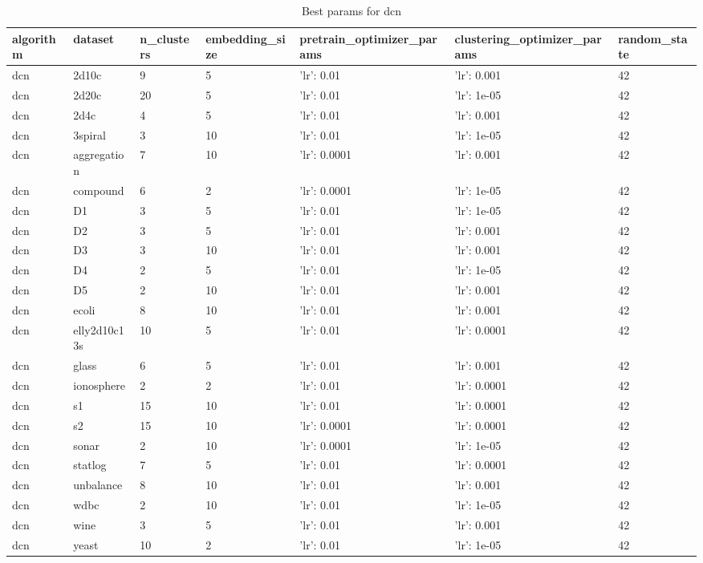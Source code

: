 \begin{table}[H]
\centering
\caption{Best params for dcn}
\label{S13_Table}
\begin{tabular}{|l|l|l|l|l|l|l|}
\hline
algorithm & dataset & n\_clusters & embedding\_size & pretrain\_optimizer\_params & clustering\_optimizer\_params & random\_state \\
\hline
dcn & 2d10c & 9 & 5 & {'lr': 0.01} & {'lr': 0.001} & 42 \\
\hline
dcn & 2d20c & 20 & 5 & {'lr': 0.01} & {'lr': 1e-05} & 42 \\
\hline
dcn & 2d4c & 4 & 5 & {'lr': 0.01} & {'lr': 0.001} & 42 \\
\hline
dcn & 3spiral & 3 & 10 & {'lr': 0.01} & {'lr': 1e-05} & 42 \\
\hline
dcn & aggregation & 7 & 10 & {'lr': 0.0001} & {'lr': 0.001} & 42 \\
\hline
dcn & compound & 6 & 2 & {'lr': 0.0001} & {'lr': 1e-05} & 42 \\
\hline
dcn & D1 & 3 & 5 & {'lr': 0.01} & {'lr': 1e-05} & 42 \\
\hline
dcn & D2 & 3 & 5 & {'lr': 0.01} & {'lr': 0.001} & 42 \\
\hline
dcn & D3 & 3 & 10 & {'lr': 0.01} & {'lr': 0.001} & 42 \\
\hline
dcn & D4 & 2 & 5 & {'lr': 0.01} & {'lr': 1e-05} & 42 \\
\hline
dcn & D5 & 2 & 10 & {'lr': 0.01} & {'lr': 0.001} & 42 \\
\hline
dcn & ecoli & 8 & 10 & {'lr': 0.01} & {'lr': 0.001} & 42 \\
\hline
dcn & elly2d10c13s & 10 & 5 & {'lr': 0.01} & {'lr': 0.0001} & 42 \\
\hline
dcn & glass & 6 & 5 & {'lr': 0.01} & {'lr': 0.001} & 42 \\
\hline
dcn & ionosphere & 2 & 2 & {'lr': 0.01} & {'lr': 0.0001} & 42 \\
\hline
dcn & s1 & 15 & 10 & {'lr': 0.01} & {'lr': 0.0001} & 42 \\
\hline
dcn & s2 & 15 & 10 & {'lr': 0.0001} & {'lr': 0.0001} & 42 \\
\hline
dcn & sonar & 2 & 10 & {'lr': 0.0001} & {'lr': 1e-05} & 42 \\
\hline
dcn & statlog & 7 & 5 & {'lr': 0.01} & {'lr': 0.0001} & 42 \\
\hline
dcn & unbalance & 8 & 10 & {'lr': 0.01} & {'lr': 0.001} & 42 \\
\hline
dcn & wdbc & 2 & 10 & {'lr': 0.01} & {'lr': 1e-05} & 42 \\
\hline
dcn & wine & 3 & 5 & {'lr': 0.01} & {'lr': 0.001} & 42 \\
\hline
dcn & yeast & 10 & 2 & {'lr': 0.01} & {'lr': 1e-05} & 42 \\
\hline
\end{tabular}
\end{table}

